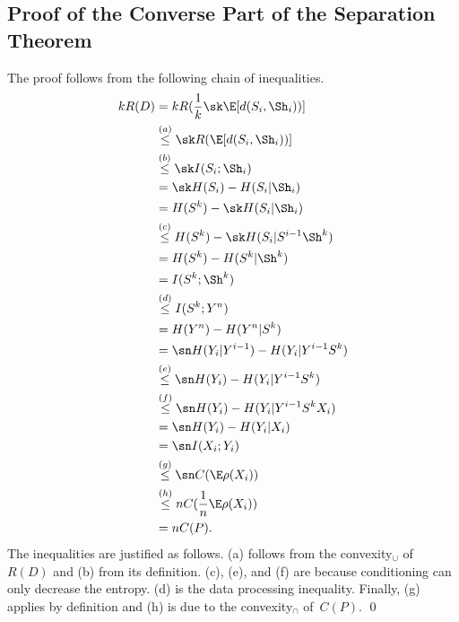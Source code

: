 

\begin{subappendices}

\section{Proof of the Converse Part of the Separation Theorem}
\label{app:separationproof}

The proof follows from the following chain of inequalities.
{\allowdisplaybreaks
\begin{align*}
  kR(D) &= k R(\frac1k \sk \E[d(S_i, \Sh_i))] \\
  &\stackrel{(a)}{\le} \sk R(\E[d(S_i, \Sh_i))] \\
  &\stackrel{(b)}{\le} \sk I(S_i; \Sh_i) \\
  &= \sk H(S_i) - H(S_i|\Sh_i) \\
  &= H(S^k) - \sk H(S_i|\Sh_i) \\
  &\stackrel{(c)}{\le} H(S^k) - \sk H(S_i|S^{i-1} \Sh^k) \\
  &=H(S^k) - H(S^k|\Sh^k) \\
  &=I(S^k;\Sh^k) \\
  &\stackrel{(d)}{\le} I(S^k; Y^n) \\
  &= H(Y^n) - H(Y^n|S^k) \\
  &= \sn H(Y_i|Y^{i-1}) - H(Y_i|Y^{i-1} S^k)  \\
  &\stackrel{(e)}{\le} \sn H(Y_i) - H(Y_i|Y^{i-1} S^k) \\
  &\stackrel{(f)}{\le} \sn H(Y_i) - H(Y_i|Y^{i-1} S^k X_i) \\
  &= \sn H(Y_i) - H(Y_i|X_i) \\
  &= \sn I(X_i; Y_i) \\
  &\stackrel{(g)}{\le} \sn C(\E \rho(X_i)) \\
  &\stackrel{(h)}{\le} n C(\frac1n \E \rho(X_i)) \\
  &= n C(P).
\end{align*}}%
The inequalities are justified as follows. (a) follows from the convexity$_\cup$
of~$R(D)$ and (b) from its definition. (c), (e), and (f) are because
conditioning can only decrease the entropy. (d) is the data processing
inequality. Finally, (g) applies by definition and (h) is due to the
convexity$_\cap$ of~$C(P)$.  \hfil\qed

\end{subappendices}
